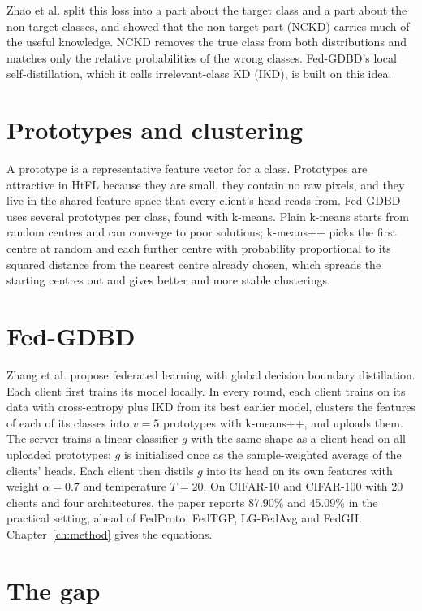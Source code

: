 Zhao et al. \cite{zhao2022dkd} split this loss into a part about the target class and a part about the non-target classes, and showed that the non-target part (NCKD) carries much of the useful knowledge. NCKD removes the true class from both distributions and matches only the relative probabilities of the wrong classes. Fed-GDBD's local self-distillation, which it calls irrelevant-class KD (IKD), is built on this idea.

\section{Prototypes and clustering}

A prototype is a representative feature vector for a class. Prototypes are attractive in HtFL because they are small, they contain no raw pixels, and they live in the shared feature space that every client's head reads from. Fed-GDBD uses several prototypes per class, found with k-means. Plain k-means starts from random centres and can converge to poor solutions; k-means++ \cite{arthur2007kmeanspp} picks the first centre at random and each further centre with probability proportional to its squared distance from the nearest centre already chosen, which spreads the starting centres out and gives better and more stable clusterings.

\section{Fed-GDBD}
\label{sec:lit-gdbd}

Zhang et al. \cite{zhang2025gdbd} propose federated learning with global decision boundary distillation. Each client first trains its model locally. In every round, each client trains on its data with cross-entropy plus IKD from its best earlier model, clusters the features of each of its classes into $v = 5$ prototypes with k-means++, and uploads them. The server trains a linear classifier $g$ with the same shape as a client head on all uploaded prototypes; $g$ is initialised once as the sample-weighted average of the clients' heads. Each client then distils $g$ into its head on its own features with weight $\alpha = 0.7$ and temperature $T = 20$. On CIFAR-10 and CIFAR-100 with 20 clients and four architectures, the paper reports 87.90\% and 45.09\% in the practical setting, ahead of FedProto, FedTGP, LG-FedAvg and FedGH. Chapter~\ref{ch:method} gives the equations.

\section{The gap}

